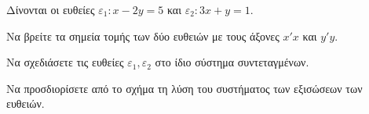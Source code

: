 Δίνονται οι ευθείες $ \varepsilon_1:x-2y=5 $ και $ \varepsilon_2:3x+y=1 $.
\begin{alist}
\item Να βρείτε τα σημεία τομής των δύο ευθειών με τους άξονες $ x'x $ και $ y'y $.
\item Να σχεδιάσετε τις ευθείες $ \varepsilon_1,\varepsilon_2 $ στο ίδιο σύστημα συντεταγμένων.
\item Να προσδιορίσετε από το σχήμα τη λύση του συστήματος των εξισώσεων των ευθειών.
\end{alist}
